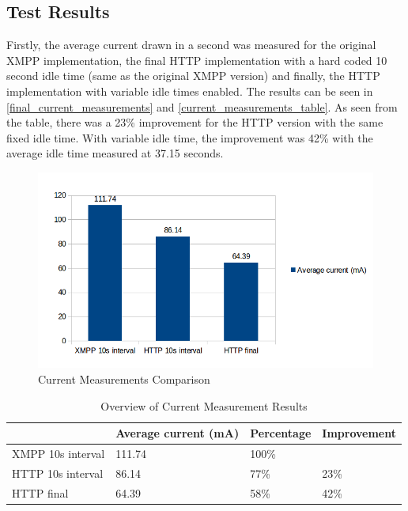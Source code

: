 \subsection{Test Results}

Firstly, the average current drawn in a second was measured for the original XMPP implementation, the final HTTP implementation with a hard coded 10 second idle time (same as the original XMPP version) and finally, the HTTP implementation with variable idle times enabled. The results can be seen in \autoref{final_current_measurements} and \autoref{current_measurements_table}. As seen from the table, there was a 23\% improvement for the HTTP version with the same fixed idle time. With variable idle time, the improvement was 42\% with the average idle time measured at 37.15 seconds. 

\begin{figure}[h!]
\centering
\includegraphics[scale=0.55]{4/figures/final_measurements.png}
\caption{Current Measurements Comparison}
\label{final_current_measurements}
\end{figure}

\begin{table}[h]
\centering
  \begin{tabular}{|l|l|l|l|}
    \hline
     & Average current (mA) & Percentage & Improvement \\ \hline
    XMPP 10s interval & 111.74 & 100\% & \\ \hline
    HTTP 10s interval & 86.14 & 77\% & 23\% \\ \hline
    HTTP final & 64.39 & 58\% & 42\% \\
    \hline
  \end{tabular}
\caption{Overview of Current Measurement Results}
\label{current_measurements_table}
\end{table}

